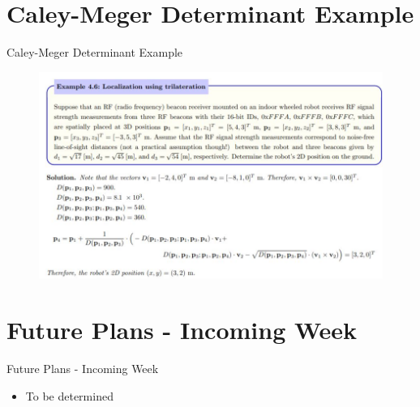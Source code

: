 \documentclass{beamer}
\begin{document}



\section{Caley-Meger Determinant Example}


\begin{frame}{Caley-Meger Determinant Example}

\begin{figure}
\centering
\includegraphics[scale=0.6]{figs/img/Lu_images/cmExample}
\end{figure}  

\end{frame}


\section{Future Plans - Incoming Week}


\begin{frame}{Future Plans - Incoming Week}

\begin{itemize}
\item To be determined
\end{itemize}


\end{frame}

\end{document}
